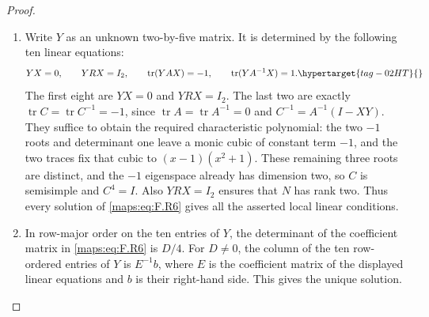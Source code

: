 \documentclass[11pt,a4paper]{article}
\numberwithin{equation}{section}
\theoremstyle{definition}
\begin{document}
\begin{proof}
\begin{enumerate}[label=\arabic*.]
\item Write $Y$ as an unknown two-by-five matrix.  It is determined
by the following ten linear equations:
\begin{equation}
 YX=0,\qquad YRX=I_2,\qquad
 \operatorname{tr}(YAX)=-1,\qquad
 \operatorname{tr}(YA^{-1}X)=1.
 \hypertarget{tag-02HT}{}\label{maps:eq:F.R6}
\end{equation}
The first eight are $YX=0$ and $YRX=I_2$. The last two are exactly
$\operatorname{tr}C=\operatorname{tr}C^{-1}=-1$, since
$\operatorname{tr}A=\operatorname{tr}A^{-1}=0$ and
$C^{-1}=A^{-1}(I-XY)$.
They suffice to obtain the required characteristic
polynomial: the two $-1$ roots and determinant one leave a
monic cubic of constant term $-1$, and the two traces fix
that cubic to $(x-1)(x^2+1)$.
These remaining three roots are distinct, and the $-1$
eigenspace already has dimension two, so $C$ is semisimple
and $C^4=I$.  Also $YRX=I_2$ ensures that $N$ has rank two.
Thus every solution of \eqref{maps:eq:F.R6} gives all the asserted local
linear conditions.

\item In row-major order on the ten entries of $Y$, the determinant
of the coefficient matrix in \eqref{maps:eq:F.R6} is $D/4$.
For $D\ne0$, the column of the ten row-ordered entries of $Y$
is $E^{-1}b$, where $E$ is the coefficient matrix of the
displayed linear equations and $b$ is their right-hand side.
This gives the unique solution.


\end{enumerate}
\end{proof}
\end{document}
